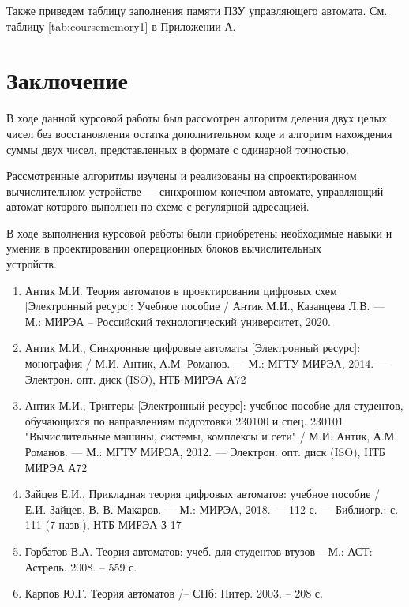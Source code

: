 \documentclass[a4paper,14pt]{extarticle}
\begin{document}
Также приведем таблицу заполнения памяти ПЗУ управляющего автомата. См. таблицу \ref{tab:coursememory1} в \hyperref[tam]{Приложении А}.
\fi
\newpage
\section{Заключение}
В ходе данной курсовой работы был рассмотрен алгоритм деления двух целых чисел без восстановления остатка дополнительном коде и алгоритм нахождения суммы двух чисел, представленных в формате с одинарной точностью. 

Рассмотренные алгоритмы изучены и реализованы на спроектированном вычислительном устройстве --- синхронном конечном автомате, управляющий автомат которого выполнен по схеме с регулярной адресацией.

В ходе выполнения курсовой работы были приобретены необходимые навыки и умения в проектировании операционных блоков вычислительных\\устройств.


\label{biblio}
\begin{enumerate}
	\item Антик М.И. Теория автоматов в проектировании цифровых схем
	[Электронный ресурс]: Учебное пособие / Антик М.И., Казанцева
	Л.В. — М.: МИРЭА – Российский технологический университет,
	2020.
	\item Антик М.И., Синхронные цифровые автоматы [Электронный ресурс]:
	монография / М.И. Антик, А.М. Романов. — М.: МГТУ МИРЭА,
	2014. — Электрон. опт. диск (ISO), НТБ МИРЭА А72
	\item Антик М.И., Триггеры [Электронный ресурс]: учебное пособие для
	студентов, обучающихся по направлениям подготовки 230100 и спец.
	230101 "Вычислительные машины, системы, комплексы и сети" /
	М.И. Антик, А.М. Романов. — М.: МГТУ МИРЭА, 2012. — Электрон.
	опт. диск (ISO), НТБ МИРЭА А72
	\item Зайцев Е.И., Прикладная теория цифровых автоматов: учебное пособие / Е.И. Зайцев, В. В. Макаров. — М.: МИРЭА, 2018. — 112 с. —
	Библиогр.: с. 111 (7 назв.), НТБ МИРЭА З-17
	\item Горбатов В.А. Теория автоматов: учеб. для студентов втузов – М.:
	АСТ: Астрель. 2008. – 559 с.
	\item  Карпов Ю.Г. Теория автоматов /– СПб: Питер. 2003. – 208 с.
\end{enumerate}

\label{tam}
\end{document}

